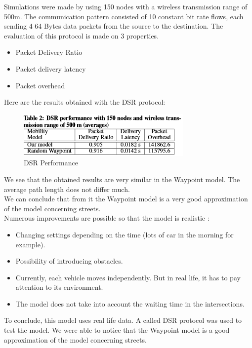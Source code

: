 Simulations were made by using 150 nodes with a wireless transmission range of 500m. The communication  pattern  consisted of 10 constant bit rate flows, each sending 4 64 Bytes data packets from the source to the destination.
The evaluation of this protocol is made on 3 properties.

\begin{itemize}
\item Packet Delivery Ratio
\item Packet delivery latency
\item Packet overhead
\end{itemize}

Here are the results obtained with the DSR protocol:\\

\begin{figure}[h]
\center
\includegraphics{../images/protocoleDSR.png}
\caption{\label{ProtDSR}DSR Performance}
\end{figure}

We see that the obtained results are very similar in the Waypoint model. The average path length does not differ much.\\
We can conclude that from it the Waypoint model is a very good approximation of the model concerning streets.\\
Numerous improvements are possible so that the model is realistic :

\begin{itemize}
\item Changing settings depending on the time (lots of car in the morning for example).
\item Possibility of introducing obstacles.
\item Currently, each vehicle moves independently. But in real life, it has to pay attention to its environment.
\item The model does not take into account the waiting time in the intersections.
\end{itemize}

To conclude, this model uses real life data. A called  DSR protocol was used to test the model. We were able to notice that the Waypoint model is a good approximation of the model concerning streets.

